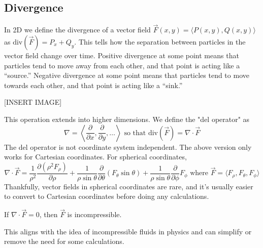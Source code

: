 \subsection{Divergence}
\noindent
In 2D we define the divergence of a vector field $\vec{F}(x,y) = \langle P(x,y), Q(x,y) \rangle$ as $\text{div}(\vec{F}) = P_x+Q_y$. This tells how the separation between particles in the vector field change over time. Positive divergence at some point means that particles tend to move away from each other, and that point is acting like a “source.” Negative divergence at some point means that particles tend to move towards each other, and that point is acting like a “sink.”

[INSERT IMAGE]

\noindent
This operation extends into higher dimensions. We define the "del operator" as
\begin{equation*}
	\nabla = \left< \frac{\partial}{\partial x}, \frac{\partial}{\partial y},\ldots\right> \text{ so that } \text{div}(\vec{F}) = \nabla \cdot \vec{F}
\end{equation*}
The del operator is not coordinate system independent. The above version only works for Cartesian coordinates. For spherical coordinates,
\begin{equation*}
	\nabla \cdot \vec{F} = \frac{1}{\rho^2}\frac{\partial(\rho^2 F_\rho)}{\partial\rho} + \frac{1}{\rho\sin{\theta}}\frac{\partial}{\partial\theta}(F_\theta \sin{\theta}) + \frac{1}{\rho\sin{\theta}}\frac{\partial}{\partial\phi}F_\phi  \text{ where } \vec{F} = \langle F_\rho, F_\theta, F_\phi \rangle
\end{equation*}
Thankfully, vector fields in spherical coordinates are rare, and it's usually easier to convert to Cartesian coordinates before doing any calculations.\\

\begin{definition}
	If $\nabla \cdot \vec{F} = 0$, then $\vec{F}$ is incompressible.
\end{definition}
\noindent
This aligns with the idea of incompressible fluids in physics and can simplify or remove the need for some calculations.

